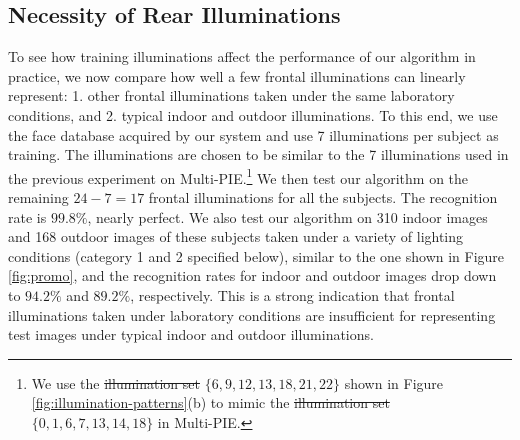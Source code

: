 \documentclass[12pt,journal,draftcls,letterpaper,onecolumn]{IEEEtran}
\providecommand{\DIFadd}[1]{{\protect\color{blue}\uwave{#1}}} %
\providecommand{\DIFdel}[1]{{\protect\color{red}\sout{#1}}}                      %
\providecommand{\DIFaddbegin}{} %
\providecommand{\DIFaddend}{} %
\providecommand{\DIFdelbegin}{} %
\providecommand{\DIFdelend}{} %
\begin{document}
\subsection{Necessity of Rear Illuminations} To see how
training illuminations affect the performance of our algorithm
in practice, we now compare how well a few frontal
illuminations can linearly represent: 1. other frontal illuminations
taken under the same laboratory conditions, and 2. typical
indoor and outdoor illuminations. To this end, we use the face
database acquired by our system and use 7 illuminations per
subject as training. The illuminations are chosen to be similar
to the 7 illuminations used in the previous experiment on
Multi-PIE.\footnote{We use the \DIFdelbegin \DIFdel{illumination set }\DIFdelend \DIFaddbegin \DIFadd{illuminations }\DIFaddend $\{6, 9, 12,
13, 18, 21, 22\}$ shown in Figure
\ref{fig:illumination-patterns}(b) to mimic the \DIFdelbegin \DIFdel{illumination
set }\DIFdelend \DIFaddbegin \DIFadd{illuminations
 }\DIFaddend $\{0, 1, 6, 7, 13, 14, 18\}$ in Multi-PIE.} We then test
our algorithm on the remaining $24 - 7 = 17$ frontal
illuminations for all the subjects. The recognition rate is
$99.8\%$, nearly perfect. We also test our algorithm on 310
indoor images and 168 outdoor images of these subjects taken
under a variety of lighting conditions (category 1 and 2
specified below), similar to the one shown in Figure
\ref{fig:promo}, and the recognition rates for indoor and
outdoor images drop down to $94.2\%$ and $89.2\%$,
respectively. This is a strong indication that 
frontal illuminations taken under laboratory conditions
are insufficient for representing test images under typical indoor and
outdoor illuminations.\vspace{-0.2in}
\end{document}
